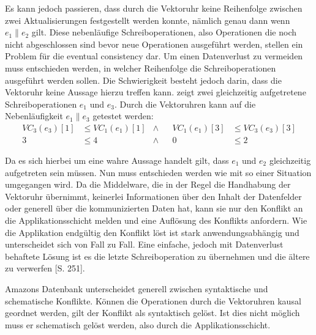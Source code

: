 Es kann jedoch passieren, dass durch die Vektoruhr keine Reihenfolge zwischen zwei Aktualisierungen festgestellt werden konnte, nämlich genau dann wenn $e_1 \parallel e_2$ gilt.
Diese nebenläufige Schreiboperationen, also Operationen die noch nicht abgeschlossen sind bevor neue Operationen ausgeführt werden, stellen ein Problem für die eventual consistency dar.
Um einen Datenverlust zu vermeiden muss entschieden werden, in welcher Reihenfolge die Schreiboperationen ausgeführt werden sollen.
Die Schwierigkeit besteht jedoch darin, dass die Vektoruhr keine Aussage hierzu treffen kann.
 zeigt zwei gleichzeitig aufgetretene Schreiboperationen $e_1$ und $e_3$.
Durch die Vektoruhren kann auf die Nebenläufigkeit $e_1 \parallel e_3$ getestet werden:
\begin{align*}
      VC_3(e_3)[1] & \leq VC_1(e_1)[1] & \wedge & & VC_1(e_1)[3] & \leq VC_3(e_3)[3] \\
         3         & \leq 4            & \wedge & & 0            & \leq 2
\end{align*}

Da es sich hierbei um eine wahre Aussage handelt gilt, dass $e_1$ und $e_2$ gleichzeitig aufgetreten sein müssen.
Nun muss entschieden werden wie mit so einer Situation umgegangen wird.
Da die Middelware, die in der Regel die Handhabung der Vektoruhr übernimmt, keinerlei Informationen über den Inhalt der Datenfelder oder generell über die kommunizierten Daten hat, kann sie nur den Konflikt an die Applikationsschicht melden und eine Auflösung des Konflikts anfordern.
Wie die Applikation endgültig den Konflikt löst ist stark anwendungsabhängig und unterscheidet sich von Fall zu Fall.
Eine einfache, jedoch mit Datenverlust behaftete Lösung ist es die letzte Schreiboperation zu übernehmen und die ältere zu verwerfen \cite{Tanenbaum2007}[S. 251].

Amazons Datenbank unterscheidet generell zwischen syntaktische und schematische Konflikte.
Können die Operationen durch die Vektoruhren kausal geordnet werden, gilt der Konflikt als syntaktisch gelöst.
Ist dies nicht möglich muss er schematisch gelöst werden, also durch die Applikationsschicht.


